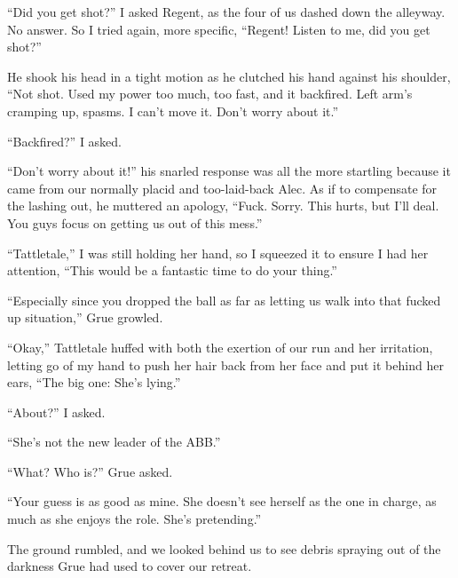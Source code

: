 





``Did you get shot?'' I asked Regent, as the four of us dashed down the alleyway.  No answer.  So I tried again, more specific, ``Regent!  Listen to me, did you get shot?''



He shook his head in a tight motion as he clutched his hand against his shoulder, ``Not shot.  Used my power too much, too fast, and it backfired.  Left arm's cramping up, spasms.  I can't move it.  Don't worry about it.''



``Backfired?'' I asked.



``Don't worry about it!'' his snarled response was all the more startling because it came from our normally placid and too-laid-back Alec.  As if to compensate for the lashing out, he muttered an apology, ``Fuck.  Sorry.  This hurts, but I'll deal.  You guys focus on getting us out of this mess.''



``Tattletale,'' I was still holding her hand, so I squeezed it to ensure I had her attention, ``This would be a fantastic time to do your thing.''



``Especially since you dropped the ball as far as letting us walk into that fucked up situation,'' Grue growled.



``Okay,'' Tattletale huffed with both the exertion of our run and her irritation, letting go of my hand to push her hair back from her face and put it behind her ears, ``The big one: She's lying.''



``About?'' I asked.



``She's not the new leader of the ABB.''



``What?  Who is?'' Grue asked.



``Your guess is as good as mine.  She doesn't see herself as the one in charge, as much as she enjoys the role.  She's pretending.''



The ground rumbled, and we looked behind us to see debris spraying out of the darkness Grue had used to cover our retreat.



